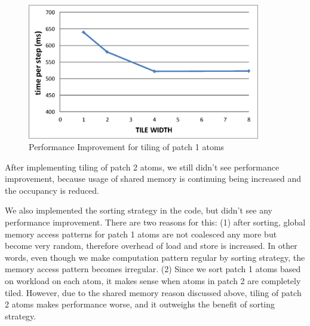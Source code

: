 \begin{figure}[h]
\centering
\setlength{\abovecaptionskip}{-1pt}
\setlength{\belowcaptionskip}{-2pt}
\includegraphics[width=4.0in]{figs/tile1-perf.eps}
\caption{Performance Improvement for tiling of patch 1 atoms}
\label{figs:tile1-perf}
\end{figure}

After implementing tiling of patch 2 atoms, we still didn't see performance improvement, because usage
of shared memory is continuing being increased and the occupancy is reduced. 

We also implemented the sorting strategy in the code, but didn't see any performance improvement. There are two
reasons for this: (1) after sorting, global memory access patterns for patch 1 atoms are not coalesced any more but become
very random, therefore overhead of load and store is increased. In other words, even though we make computation pattern regular
by sorting strategy, the memory access pattern becomes irregular. (2) Since we sort patch 1 atoms based on workload
on each atom, it makes sense when atoms in patch 2 are completely tiled. However, due to the shared memory
reason discussed above, tiling of patch 2 atoms makes performance worse, and it outweighs the benefit of sorting strategy.



